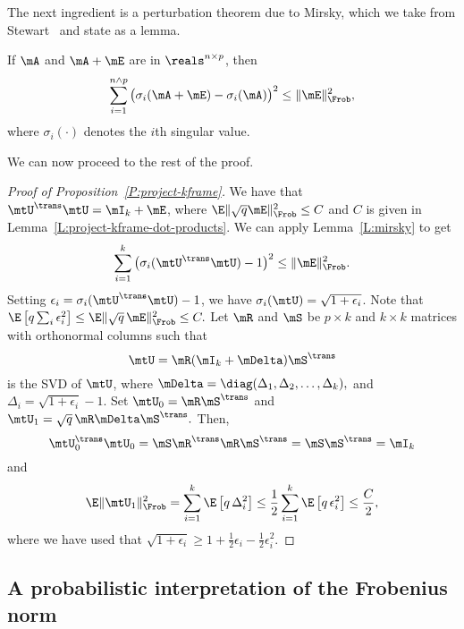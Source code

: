 The next ingredient is a perturbation theorem due to Mirsky, which we take 
from Stewart~\cite{stewart1990pts} and state as a lemma.

\begin{lemma}[Mirsky]\label{L:mirsky}
    If $\mA$ and $\mA + \mE$ are in $\reals^{n \times p}$, then
    \[
        \sum_{i=1}^{n \wedge p} 
            \big(
                \sigma_i(\mA + \mE) - \sigma_i( \mA ) 
            \big)^2 
        \leq \| \mE \|_\Frob^2,
    \]
    where $\sigma_i(\cdot)$ denotes the $i$th singular value.
\end{lemma}

We can now proceed to the rest of the proof.
\begin{proof}[Proof of Proposition~\ref{P:project-kframe}]
    We have that $\mtU^\trans \mtU = \mI_k + \mE$, 
    where $\E \| \sqrt{q} \mE \|_\Frob^2 \leq C$ and $C$ is
    given in Lemma~\ref{L:project-kframe-dot-products}.
    We can apply Lemma~\ref{L:mirsky} to get
    \[
        \sum_{i=1}^k 
            \big(
                \sigma_i(\mtU^\trans \mtU) - 1
            \big)^2 
        \leq \| \mE \|_\Frob^2.
    \]
    Setting $\epsilon_i = \sigma_i(\mtU^\trans \mtU) - 1$, we have 
    $\sigma_i( \mtU ) = \sqrt{1 + \epsilon_i}$.  Note that 
    \(
        \E \left[ q \sum_i \epsilon_i^2 \right]
        \leq \E \| \sqrt{q} \, \mE \|_\Frob^2
        \leq C.
    \)
    Let $\mR$ and $\mS$ be $p \times k$ and $k \times k$ matrices
    with orthonormal columns such that
    \[
        \mtU = \mR (\mI_k + \mDelta) \mS^\trans
    \]
    is the SVD of $\mtU$, where 
    \(
        \mDelta
            = 
                \diag( 
                    \Delta_1, \Delta_2, \ldots, \Delta_k
                ),
    \)
    and $\Delta_i = \sqrt{ 1 + \epsilon_i } - 1.$  Set
    \(
        \mtU_0 = \mR \mS^\trans
    \)
    and
    \(
        \mtU_1 = \sqrt{q} \, \mR \mDelta \mS^\trans.
    \)
    Then,
    \[
        \mtU_0^\trans \mtU_0 
                = \mS \mR^\trans \mR \mS^\trans
                = \mS \mS^\trans
                = \mI_k
    \]
    and 
    \[
        \E \| \mtU_1 \|_\Frob^2 
            = \sum_{i=1}^k \E \left[ q \, \Delta_i^2 \right]
            \leq \frac{1}{2} \sum_{i=1}^k \E \left[ q \, \epsilon_i^2 \right]
            \leq \frac{C}{2},
    \]
    where we have used that
    \(
        \sqrt{1 + \epsilon_i} 
            \geq 
                1 + \frac{1}{2} \epsilon_i - \frac{1}{2} \epsilon_i^2.
    \)
\end{proof}


\subsection{A probabilistic interpretation of the Frobenius norm}


